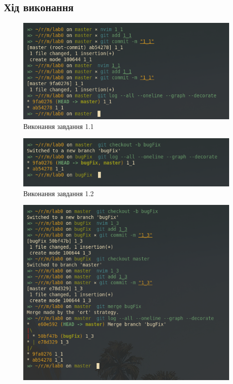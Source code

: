 \documentclass[oneside,14pt]{extarticle}
\begin{document}
\begin{normalsize}
	\section*{Хід виконання}
		\begin{figure}[H]
			\centering
			\includegraphics[scale=0.6]{1_1}
			\caption{Виконання завдання 1.1}
		\end{figure}
		\begin{figure}[H]
			\centering
			\includegraphics[scale=0.6]{1_2}
			\caption{Виконання завдання 1.2}
		\end{figure}
				\begin{figure}[H]
			\centering
			\includegraphics[scale=0.6]{1_3}

\end{figure}
\end{normalsize}
\end{document}
